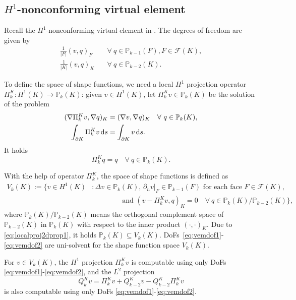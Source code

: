 \documentclass[10pt]{amsart}
\newcounter{mnote}
\newcommand{\mnote}[1]{\addtocounter{mnote}{1}
    \ensuremath{{}^{\bullet\arabic{mnote}}}
    \marginpar{\footnotesize\em\color{red}\ensuremath{\bullet\arabic{mnote}}#1}}
\let\oldmarginpar\marginpar
\renewcommand\marginpar[1]{\-\oldmarginpar[\raggedleft\footnotesize #1]%
    {\raggedright\footnotesize #1}}
\numberwithin{equation}{section}
\begin{document}
\subsection{$H^1$-nonconforming virtual element}

Recall the $H^1$-nonconforming virtual element in \cite{ChenHuang2020ncvem,Huang2020,AyusodeDiosLipnikovManzini2016}.
The degrees of freedom are given by
\begin{align}
\frac{1}{|F|}(v, q)_F & \quad\forall~q\in\mathbb P_{k-1}(F), F\in\mathcal F(K), \label{eq:vemdof1}\\
\frac{1}{|K|}(v, q)_K & \quad\forall~q\in\mathbb P_{k-2}(K). \label{eq:vemdof2}
\end{align}

To define the space of shape functions, we need a local $H^1$ projection operator $\Pi_k^K: H^1(K)\to\mathbb P_k(K)$: given $v\in H^1(K)$, let $\Pi_k^Kv\in\mathbb P_k(K)$ be the solution of the problem %
\begin{align}
(\nabla\Pi_k^Kv, \nabla q)_K&=(\nabla v, \nabla q)_K\quad  \forall~q\in \mathbb P_k(K), \label{eq:projlocal2d1}\\
\int_{\partial K}\Pi_k^Kv\,{\rm d}s&=\int_{\partial K}v\,{\rm d}s. \label{eq:projlocal2d2}
\end{align}
It holds
\begin{equation}\label{eq:localproj2dprop1}
\Pi_k^Kq=q \quad\forall~q\in\mathbb P_k(K).    
\end{equation}

With the help of operator $\Pi_k^K$, the space of shape functions is defined as
\begin{align*}
V_k(K):=\{v\in H^1(K) &: \Delta v\in\mathbb P_{k}(K),\, \partial_nv|_F\in\mathbb P_{k-1}(F)\textrm{ for each face }F\in\mathcal F(K), \\
&\qquad\qquad\; \textrm{and } (v-\Pi_k^Kv, q)_K=0\quad\forall~q\in\mathbb P_{k}(K)/\mathbb P_{k-2}(K)\},
\end{align*}
where $\mathbb P_{k}(K)/\mathbb P_{k-2}(K)$ means the orthogonal complement space of $\mathbb P_{k-2}(K)$ in $\mathbb P_{k}(K)$ with respect to the inner product $(\cdot, \cdot)_K$.
Due to \eqref{eq:localproj2dprop1}, it holds $\mathbb P_k(K)\subseteq V_k(K)$.
DoFs~\eqref{eq:vemdof1}-\eqref{eq:vemdof2} are uni-solvent for the shape function space $V_k(K)$.

For $v\in V_k(K)$, the $H^1$ projection $\Pi_k^Kv$ is computable using only DoFs \eqref{eq:vemdof1}-\eqref{eq:vemdof2}, and the $L^2$ projection
\begin{equation}\label{eq:QKPik}  
Q_k^Kv= \Pi_k^Kv + Q_{k-2}^Kv-Q_{k-2}^K\Pi_k^Kv
\end{equation}
is also computable using only DoFs \eqref{eq:vemdof1}-\eqref{eq:vemdof2}. 
\end{document}
